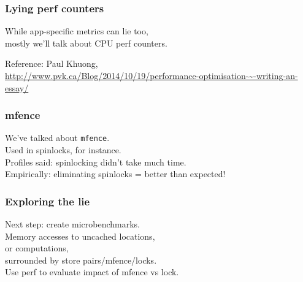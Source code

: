 \begin{frame}
  \frametitle{Lying perf counters}
  
  
    While app-specific metrics can lie too,\\
    mostly we'll talk about CPU perf counters.
  

\vspace*{-6em}


  \begin{center}
    Reference: Paul Khuong,\\
  \scriptsize
  \url{http://www.pvk.ca/Blog/2014/10/19/performance-optimisation-~-writing-an-essay/}

  \end{center}

\end{frame}

\begin{frame}
  \frametitle{mfence}


    We've talked about {\tt mfence}.\\
    Used in spinlocks, for instance.\\[2em]
    Profiles said: spinlocking didn't take much time.\\
    Empirically: eliminating spinlocks = better than expected!
    
  
  
\end{frame}

\begin{frame}
  \frametitle{Exploring the lie}

  
    Next step: create microbenchmarks.\\[1em]
    Memory accesses to uncached locations,\\
    or computations,\\[1em]
    surrounded by store pairs/mfence/locks.\\[1em]
    Use perf to evaluate impact of mfence vs lock.
  

\end{frame}

